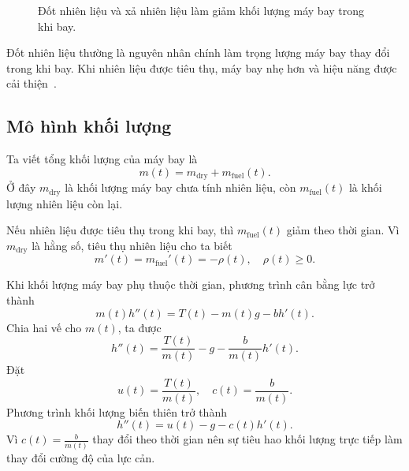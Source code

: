 ﻿\documentclass[12pt]{article}
\begin{document}
\begin{figure}[h]
\centering
{}
\caption{Đốt nhiên liệu và xả nhiên liệu làm giảm khối lượng máy bay trong khi bay.}
\label{fig:aircraft-fuel-dumping}
\end{figure}
Đốt nhiên liệu thường là nguyên nhân chính làm trọng lượng máy bay thay đổi trong khi bay. Khi nhiên liệu được tiêu thụ, máy bay nhẹ hơn và hiệu năng được cải thiện~\cite{stevens_lewis_johnson_aircraft_control_2015}.

\subsection{Mô hình khối lượng}
Ta viết tổng khối lượng của máy bay là
\[
 m(t) = m_{\mathrm{dry}} + m_{\mathrm{fuel}}(t).
\]
Ở đây $m_{\mathrm{dry}}$ là khối lượng máy bay chưa tính nhiên liệu, còn $m_{\mathrm{fuel}}(t)$ là khối lượng nhiên liệu còn lại.

Nếu nhiên liệu được tiêu thụ trong khi bay, thì $m_{\mathrm{fuel}}(t)$ giảm theo thời gian.
Vì $m_{\mathrm{dry}}$ là hằng số, tiêu thụ nhiên liệu cho ta biết
\[
 m'(t) = m_{\mathrm{fuel}}'(t) = -\rho(t),\quad \rho(t)\ge 0.
\]

Khi khối lượng máy bay phụ thuộc thời gian, phương trình cân bằng lực trở thành
\[
 m(t)h''(t) = T(t) - m(t)g - bh'(t).
\]
Chia hai vế cho $m(t)$, ta được
\[
 h''(t) = \frac{T(t)}{m(t)} - g - \frac{b}{m(t)}h'(t).
\]
Đặt
\[
 u(t) = \frac{T(t)}{m(t)},\quad c(t) = \frac{b}{m(t)}.
\]
Phương trình khối lượng biến thiên trở thành
\[
 \boxed{ h''(t) = u(t) - g - c(t)h'(t). }
\]
Vì $c(t) = \frac{b}{m(t)}$ thay đổi theo thời gian nên sự tiêu hao khối lượng trực tiếp làm thay đổi cường độ của lực cản. 
\end{document}
